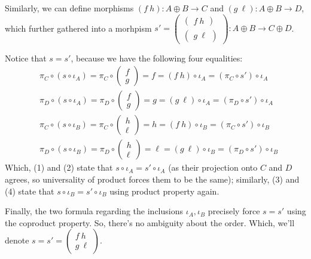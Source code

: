 \documentclass{article}
\begin{document}
Similarly, we can define morphisms $(f\ h):A\oplus B\rightarrow C$ and $(g\ \ell):A\oplus B\rightarrow D$, which further gathered into a morhpism $s'=\begin{pmatrix}
    \begin{pmatrix}
        f\ h
    \end{pmatrix}\\
    \begin{pmatrix}
        g\ \ell
    \end{pmatrix}
\end{pmatrix}:A\oplus B\rightarrow C\oplus D$.

Notice that $s=s'$, because we have the following four equalities:
\begin{align}
    &\pi_C\circ (s\circ \iota_A) = \pi_C \circ \begin{pmatrix}
        f\\g
    \end{pmatrix} = f = (f\ h)\circ \iota_A = (\pi_C\circ s')\circ \iota_A\\
    &\pi_D\circ (s\circ \iota_A) = \pi_D \circ \begin{pmatrix}
        f\\g
    \end{pmatrix} = g = (g\ \ell)\circ \iota_A = (\pi_D\circ s')\circ \iota_A\\
    &\pi_C\circ (s\circ \iota_B) = \pi_C \circ \begin{pmatrix}
        h\\\ell
    \end{pmatrix} = h = (f\ h)\circ \iota_B = (\pi_C\circ s')\circ \iota_B\\
    &\pi_D\circ (s\circ \iota_B) = \pi_D \circ \begin{pmatrix}
        h\\\ell
    \end{pmatrix} = \ell = (g\ \ell)\circ \iota_B = (\pi_D\circ s')\circ \iota_B
\end{align}
Which, (1) and (2) state that $s\circ \iota_A = s'\circ \iota_A$ (as their projection onto $C$ and $D$ agrees, so universality of product forces them to be the same); similarly, (3) and (4) state that $s\circ \iota_B=s'\circ \iota_B$ using product property again.

Finally, the two formula regarding the inclusions $\iota_A,\iota_B$ precisely force $s=s'$ using the coproduct property. So, there's no ambiguity about the order. Which, we'll denote $s=s' = \begin{pmatrix}
    f\ h\\g\ \ell
\end{pmatrix}$.
\end{document}
